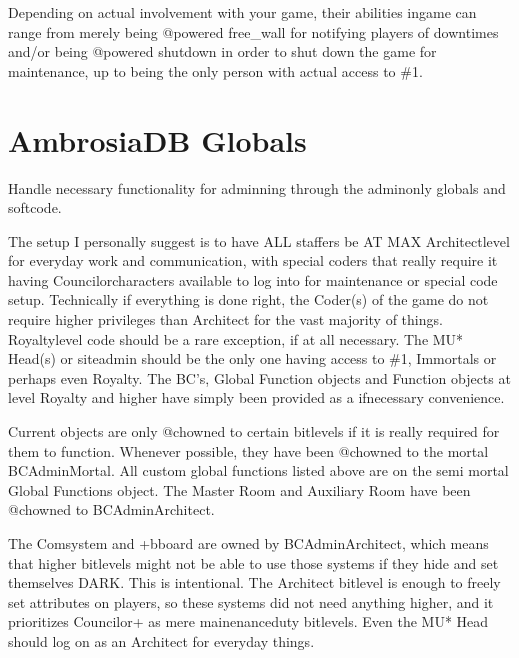\documentclass[letterpaper,10pt,english]{sphinxmanual}
\begin{document}
\sphinxAtStartPar
Depending on actual involvement with your game, their abilities
in\sphinxhyphen{}game can range from merely being @powered free\_wall for
notifying players of downtimes and/or being @powered shutdown in
order to shut down the game for maintenance, up to being the
only person with actual access to \#1.


\section{AmbrosiaDB Globals}
\label{\detokenize{ambrosiadb:ambrosiadb-globals}}
\sphinxAtStartPar
Handle necessary functionality for adminning through the admin\sphinxhyphen{}only globals and
softcode.

\sphinxAtStartPar
The setup I personally suggest is to have ALL staffers be AT MAX Architect\sphinxhyphen{}level
for everyday work and communication, with special coders that \sphinxhyphen{}really\sphinxhyphen{} require
it having Councilor\sphinxhyphen{}characters available to log into for maintenance or special
code setup. Technically if everything is done right, the Coder(s) of the game do
not require higher privileges than Architect for the vast majority of things.
Royalty\sphinxhyphen{}level code should be a rare exception, if at all necessary. The MU*
Head(s) or site\sphinxhyphen{}admin should be the only one having access to \#1, Immortals or
perhaps even Royalty. The BC’s, Global Function objects and Function objects at
level Royalty and higher have simply been provided as a if\sphinxhyphen{}necessary convenience.

\sphinxAtStartPar
Current objects are only @chowned to certain bitlevels if it is really required
for them to function. Whenever possible, they have been @chowned to the mortal
BC\sphinxhyphen{}Admin\sphinxhyphen{}Mortal. All custom global functions listed above are on the semi\sphinxhyphen{}
\sphinxhyphen{}mortal Global Functions object. The Master Room and Auxiliary Room have been
@chowned to BC\sphinxhyphen{}Admin\sphinxhyphen{}Architect.

\sphinxAtStartPar
The Comsystem and +bboard are owned by BC\sphinxhyphen{}Admin\sphinxhyphen{}Architect, which means that
higher bitlevels might not be able to use those systems if they hide and set
themselves DARK. This is intentional. The Architect bitlevel is enough to freely
set attributes on players, so these systems did not need anything higher, and
it prioritizes Councilor+ as mere mainenance\sphinxhyphen{}duty bitlevels. Even the MU* Head
should log on as an Architect for everyday things.
\end{document}
